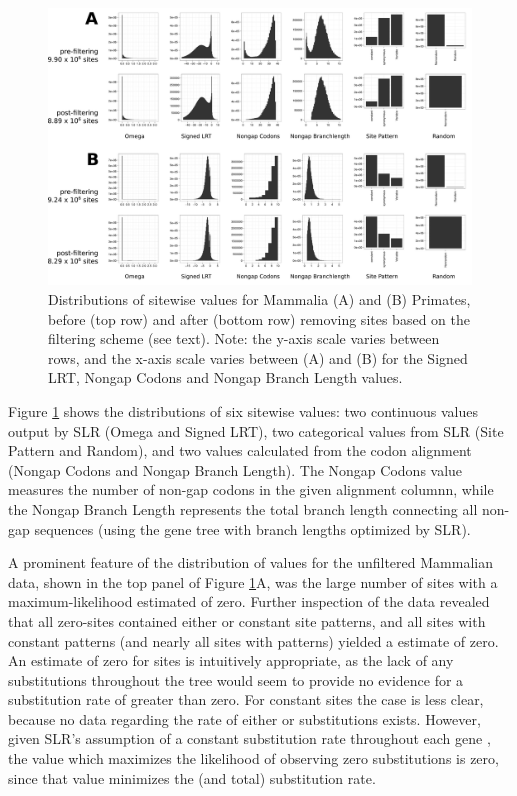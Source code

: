 \begin{landscape}
\begin{figure}
\centering
\includegraphics[scale=0.42]{Figs/qc_hist_mammals_primates.pdf}
\caption{Distributions of sitewise values for Mammalia (A) and (B)
  Primates, before (top row) and after (bottom row) removing sites
  based on the filtering scheme (see text). Note: the y-axis scale
  varies between rows, and the x-axis scale varies between (A) and (B)
  for the Signed LRT, Nongap Codons and Nongap Branch Length values.}
\label{qc_hist_mammals_primates}
\end{figure}
\end{landscape}
 
Figure \ref{qc_hist_mammals_primates} shows the distributions of six
sitewise values: two continuous values output by SLR (Omega and Signed
LRT), two categorical values from SLR (Site Pattern and Random), and
two values calculated from the codon alignment (Nongap Codons and
Nongap Branch Length). The Nongap Codons value measures the number of
non-gap codons in the given alignment columnn, while the Nongap
Branch Length represents the total branch length connecting all non-gap
sequences (using the gene tree with branch lengths optimized by SLR).

A prominent feature of the distribution of \omg values for the
unfiltered Mammalian data, shown in the top panel of Figure
\ref{qc_hist_mammals_primates}A, was the large number of sites with a
maximum-likelihood estimated \omg of zero. Further inspection of the
data revealed that all zero-\omg sites contained either \syn or
constant site patterns, and all sites with constant patterns (and
nearly all sites with \syn patterns) yielded a \ml \omg estimate of
zero. An estimate of zero for \syn sites is intuitively appropriate,
as the lack of any \nsyn substitutions throughout the tree would seem
to provide no evidence for a \nsyn substitution rate of greater than
zero. For constant sites the case is less clear, because no data
regarding the rate of either \syn or \nsyn substitutions
exists. However, given SLR's assumption of a constant \syn
substitution rate throughout each gene \citep{Massingham2005},
the \omg value which maximizes the likelihood of observing zero
substitutions is zero, since that value minimizes the \nsyn (and
total) substitution rate.

